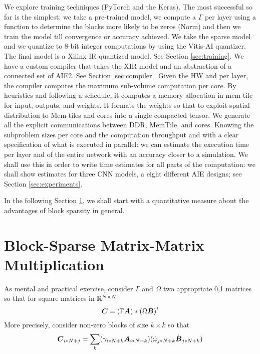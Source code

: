 \documentclass[sigconf]{acmart}
\begin{document}
We explore training techniques (PyTorch and the Keras).  The most
successful so far is the simplest: we take a pre-trained model, we
compute a $\Gamma$ per layer using a function to determine the blocks
more likely to be zeros (Norm) and then we train the model till
convergence or accuracy achieved. We take the sparse model and we
quantize to 8-bit integer computations by using the Vitis-AI
quantizer. The final model is a Xilinx IR quantized model. See Section
\ref{sec:training}. We have a custom compiler that takes the XIR model
and an abstraction of a connected set of AIE2. See Section
\ref{sec:compiler}. Given the HW and per layer, the compiler computes
the maximum sub-volume computation per core. By heuristics and
following a schedule, it computes a memory allocation in mem-tile for
input, outputs, and weights. It formats the weights so that to exploit
spatial distribution to Mem-tiles and cores into a single compacted
tensor. We generate all the explicit communications between DDR,
MemTile, and cores. Knowing the subproblem sizes per core and the
computation throughput and with a clear specification of what is
executed in parallel: we can estimate the execution time per layer and
of the entire network with an accuracy closer to a simulation.  We
shall use this in order to write time estimates for all parts of the
computation: we shall show estimates for three CNN models, a eight
different AIE designs; see Section \ref{sec:experiments}.

In the following Section \ref{sec:motivation}, we shall start with a
quantitative measure about the advantages of block sparsity in
general.

\section{Block-Sparse Matrix-Matrix Multiplication}
\label{sec:motivation}

 As mental and practical exercise, consider $\Gamma$ and
$\Omega$ two appropriate 0,1 matrices so that for square matrices in
$\mathbb{R}^{N\times N}$
\begin{equation}
  {\boldsymbol C} = (\Gamma {\boldsymbol A}) * (\Omega {\boldsymbol B})^t
\end{equation}
More precisely, consider non-zero blocks of size $k\times k$ so that
\begin{equation}
  {\boldsymbol C}_{i*N+j} = \sum_k ( \gamma_{i*N+k} {\boldsymbol A}_{i*N+k} ) (\dot{\omega}_{j*N+k} \dot{{\boldsymbol B}}_{j*N+k})
\end{equation}
\end{document}
